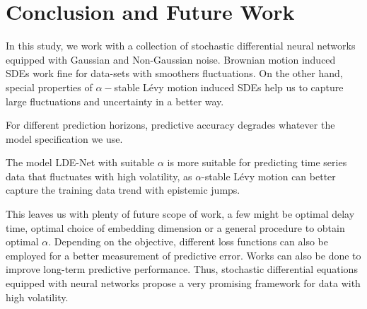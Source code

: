 \chapter{Conclusion and Future Work}

In this study, we work with a collection of stochastic differential neural networks equipped with Gaussian and Non-Gaussian noise. Brownian motion induced SDEs work fine for data-sets with smoothers fluctuations. On the other hand, special properties of $\alpha-$stable Lévy motion induced SDEs help us to capture large fluctuations and uncertainty in a better way. 

For different prediction horizons, predictive accuracy degrades whatever the model specification we use. 

The model LDE-Net with suitable $\alpha$ is more suitable for predicting time series data that fluctuates with high volatility, as $\alpha$-stable Lévy motion can better capture the training data trend with epistemic jumps.

This leaves us with plenty of future scope of work, a few might be optimal delay time, optimal choice of embedding dimension or a general procedure to obtain optimal $\alpha$. Depending on the objective, different loss functions can also be employed for a better measurement of predictive error. Works can also be done to improve long-term predictive performance. Thus, stochastic differential equations equipped with neural networks propose a very promising framework for data with high volatility.
\clearpage